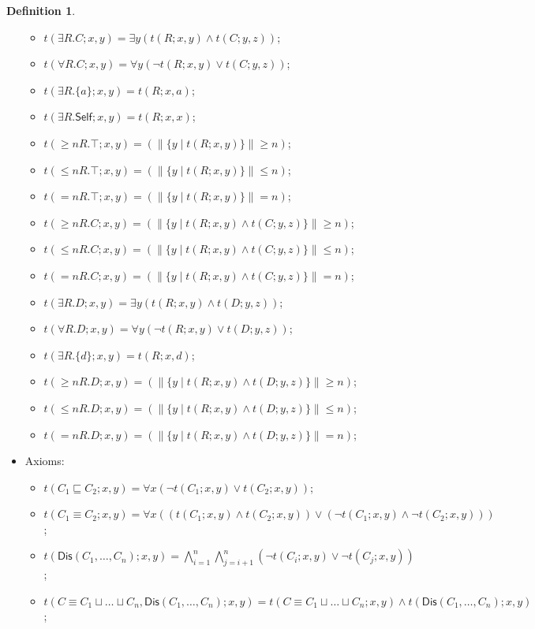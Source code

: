 \documentclass[review]{elsarticle}
\theoremstyle{definition}
\newtheorem{definition}{Definition}
\begin{document}
\begin{definition}
\begin{itemize}
\begin{itemize}
  \item $t(\exists R.C; x, y) = \exists y(t(R; x, y) \land t(C; y, z))$;
  \item $t(\forall R.C; x, y) = \forall y(\neg t(R; x, y) \lor t(C; y, z))$;
  \item $t(\exists R.\{a\}; x, y) = t(R; x, a)$;
  \item $t(\exists R.\mathsf{Self}; x, y) = t(R; x, x)$;
  \item $t(\geq nR.\top; x, y) = (\|\{y \mid t(R; x, y) \}\| \geq n)$;
  \item $t(\leq nR.\top; x, y) = (\|\{y \mid t(R; x, y) \}\| \leq n)$;
  \item $t(=nR.\top; x, y) = (\|\{y \mid t(R; x, y) \}\| = n)$;
  \item $t(\geq nR.C; x, y) = (\|\{y \mid t(R; x, y) \land t(C; y, z) \}\| \geq n)$;
  \item $t(\leq nR.C; x, y) = (\|\{y \mid t(R; x, y) \land t(C; y, z) \}\| \leq n)$;
  \item $t(=nR.C; x, y) = (\|\{y \mid t(R; x, y) \land t(C; y, z) \}\| = n)$;
  \item $t(\exists R.D; x, y) = \exists y(t(R; x, y) \land t(D; y, z))$;
  \item $t(\forall R.D; x, y) = \forall y(\neg t(R; x, y) \lor t(D; y, z))$;
  \item $t(\exists R.\{d\}; x, y) = t(R; x, d)$;
  \item $t(\geq nR.D; x, y) = (\|\{y \mid t(R; x, y) \land t(D; y, z) \}\| \geq n)$;
  \item $t(\leq nR.D; x, y) = (\|\{y \mid t(R; x, y) \land t(D; y, z) \}\| \leq n)$;
    \item $t(=nR.D; x, y) = (\|\{y \mid t(R; x, y) \land t(D; y, z) \}\| = n)$;
    \end{itemize}
  \item Axioms:
    \begin{itemize}
    \item $t(C_1 \sqsubseteq C_2; x, y) = \forall x(\neg t(C_1; x, y) \lor t(C_2; x, y))$; 
  \item $t(C_1 \equiv C_2; x, y) = \forall x((t(C_1; x, y) \land t(C_2; x, y)) \lor
    (\neg t(C_1; x, y) \land \neg t(C_2; x, y)))$;
  \item $t(\mathsf{Dis}(C_1, \ldots, C_n); x, y) =
    \bigwedge_{i = 1}^n\bigwedge_{j = i + 1}^n(\neg t(C_i; x, y) \lor \neg t(C_j; x, y))$;
  \item $t(C \equiv C_1 \sqcup \ldots \sqcup C_n, \mathsf{Dis}(C_1, \ldots, C_n); x, y) = t(C \equiv C_1 \sqcup \ldots \sqcup C_n; x, y) \land t(\mathsf{Dis}(C_1, \ldots, C_n); x, y)$;

\end{itemize}
\end{itemize}
\end{definition}
\end{document}
